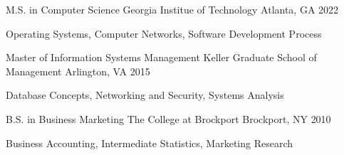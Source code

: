 

\begin{cventries}

  \cventry
    {M.S. in Computer Science} %
    {Georgia Institue of Technology} %
    {Atlanta, GA} %
    {2022} %
    {
      \begin{cvitems} %
        \item {Operating Systems, Computer Networks, Software Development Process}
      \end{cvitems}
    }

  \cventry
    {Master of Information Systems Management} %
    {Keller Graduate School of Management} %
    {Arlington, VA} %
    {2015} %
    {
      \begin{cvitems} %
        \item {Database Concepts, Networking and Security, Systems Analysis}
      \end{cvitems}
    }
  \cventry
    {B.S. in Business Marketing} %
    {The College at Brockport} %
    {Brockport, NY} %
    {2010} %
    {
      \begin{cvitems} %
        \item {Business Accounting, Intermediate Statistics, Marketing Research}
      \end{cvitems}
    }
\end{cventries}
